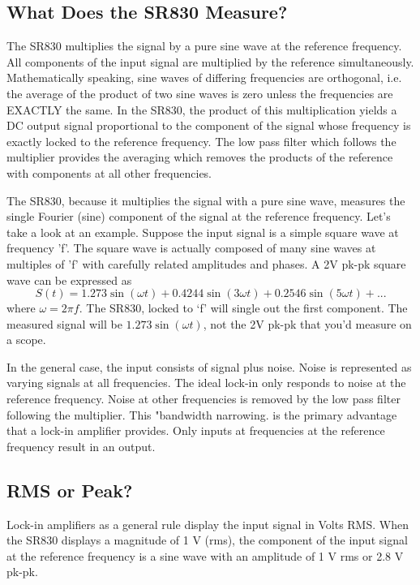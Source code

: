 \documentclass{../lab}
\begin{document}
\newpage

\subsection{What Does the SR830 Measure?}

The SR830 multiplies the signal by a pure sine wave at the reference frequency. All components of the input signal are multiplied by the reference simultaneously. Mathematically speaking, sine waves of differing frequencies are orthogonal, i.e. the average of the product of two sine waves is zero unless the frequencies are EXACTLY the same. In the SR830, the product of this multiplication yields a DC output signal proportional to the component of the signal whose frequency is exactly locked to the reference frequency. The low pass filter which follows the multiplier provides the averaging which removes the products of the reference with components at all other frequencies.

The SR830, because it multiplies the signal with a pure sine wave, measures the single Fourier (sine) component of the signal at the reference frequency. Let's take a look at an example. Suppose the input signal is a simple square wave at frequency 'f'. The square wave is actually composed of many sine waves at multiples of 'f' with carefully related amplitudes and phases. A 2V pk-pk square wave can be expressed as
\[
    S(t) = 1.273 \sin(\omega t) + 0.4244 \sin(3 \omega t) + 0.2546 \sin(5 \omega t) + ...
\]
where $\omega = 2 \pi f$. The SR830, locked to `f' will single out the first component. The measured signal will be $1.273 \sin(\omega t)$, not the 2V pk-pk that you'd measure on a scope.

In the general case, the input consists of signal plus noise. Noise is represented as varying signals at all frequencies. The ideal lock-in only responds to noise at the reference frequency. Noise at other frequencies is removed by the low pass filter following the multiplier. This "bandwidth narrowing. is the primary advantage that a lock-in amplifier provides. Only inputs at frequencies at the reference frequency result in an output.

\subsection{RMS or Peak?}

Lock-in amplifiers as a general rule display the input signal in Volts RMS. When the SR830 displays a magnitude of 1 V (rms), the component of the input signal at the reference frequency is a sine wave with an amplitude of 1 V rms or 2.8 V pk-pk.
\end{document}
